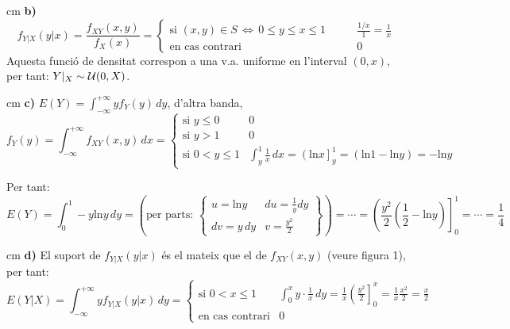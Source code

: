 \documentclass{article}
\begin{document}
 cm
\noindent
\textbf{b)} 
\[
f_{Y|X}(y|x)=\frac{f_{XY}(x, y)}{f_X(x)}=\begin{cases}
\text{si } (x, y) \in S \, \Leftrightarrow \, 0 \leq y \leq x \leq 1 & \qquad \frac{1/x}{1}=\frac{1}{x} \\
\text{en cas contrari} & \qquad 0
\end{cases}
\]
\noindent
Aquesta funci\'o de densitat correspon a una v.a. uniforme en l'interval $(0, x)$, per tant: $Y|_X \sim {\cal U}(0, X)$.

 cm
\noindent
\textbf{c)} $E(Y)=\int_{-\infty}^{+\infty} y f_Y(y) \, dy$, d'altra banda,
\[
f_Y(y)=\int_{-\infty}^{+\infty} f_{XY}(x, y) \, dx=\begin{cases}
\text{si } y \leq 0 & 0\\
\text{si } y > 1 & 0 \\
\text{si } 0 < y \leq 1 & \int_y^1 \frac{1}{x} \, dx = \left( \mathrm{ln} x \right]_y^1=
(\mathrm{ln} 1 - \mathrm{ln} y)= -\mathrm{ln}y
\end{cases}
\]

\noindent
Per tant:
\[
E(Y)=\int_0^1 - y \mathrm{ln}y \, dy= \left( \text{per parts: }
\left\{ \begin{array}{ll} u=\mathrm{ln} y & du= \frac{1}{y} dy \\ dv=y\, dy & v=\frac{y^2}{2} \end{array} \right\} \right)
 =\cdots=
\left( \frac{y^2}{2} (\frac{1}{2}-\mathrm{ln}y) \right]_0^1=\cdots=\frac{1}{4}
\]

 cm
\noindent
\textbf{d)} El suport de $f_{Y|X}(y|x)$ \'es el mateix que el de $f_{XY}(x, y)$ (veure figura 1), per tant:
\[
E(Y|X)=\int_{-\infty}^{+\infty} y f_{Y|X}(y|x) \, dy =\begin{cases}
\text{si } 0 < x \leq 1 & \int_0^x y \cdot \frac{1}{x} \, dy = \frac{1}{x} \left( \frac{y^2}{2}\right]_0^x = 
\frac{1}{x} \frac{x^2}{2}=\frac{x}{2}\\
\text{en cas contrari} & 0 \end{cases}
\]
\end{document}
